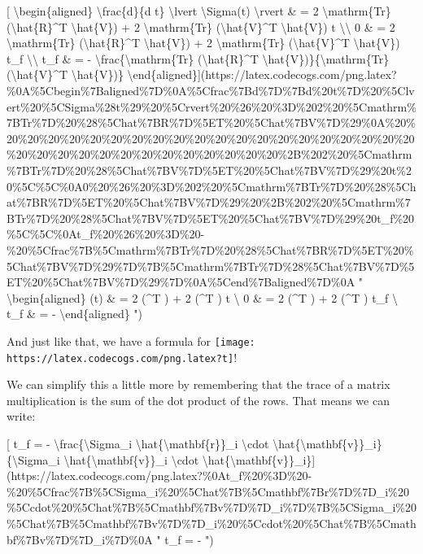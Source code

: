 \documentclass[]{article}
\begin{document}
{[} \textbackslash{}begin\{aligned\} \textbackslash{}frac\{d\}\{d t\}
\textbackslash{}lvert \textbackslash{}Sigma(t) \textbackslash{}rvert \& = 2
\textbackslash{}mathrm\{Tr\} (\textbackslash{}hat\{R\}\^{}T
\textbackslash{}hat\{V\}) + 2 \textbackslash{}mathrm\{Tr\}
(\textbackslash{}hat\{V\}\^{}T \textbackslash{}hat\{V\}) t
\textbackslash{}\textbackslash{} 0 \& = 2 \textbackslash{}mathrm\{Tr\}
(\textbackslash{}hat\{R\}\^{}T \textbackslash{}hat\{V\}) + 2
\textbackslash{}mathrm\{Tr\} (\textbackslash{}hat\{V\}\^{}T
\textbackslash{}hat\{V\}) t\_f \textbackslash{}\textbackslash{} t\_f \& = -
\textbackslash{}frac\{\textbackslash{}mathrm\{Tr\}
(\textbackslash{}hat\{R\}\^{}T
\textbackslash{}hat\{V\})\}\{\textbackslash{}mathrm\{Tr\}(\textbackslash{}hat\{V\}\^{}T
\textbackslash{}hat\{V\})\}
\textbackslash{}end\{aligned\}{]}(https://latex.codecogs.com/png.latex?\%0A\%5Cbegin\%7Baligned\%7D\%0A\%5Cfrac\%7Bd\%7D\%7Bd\%20t\%7D\%20\%5Clvert\%20\%5CSigma\%28t\%29\%20\%5Crvert\%20\%26\%20\%3D\%202\%20\%5Cmathrm\%7BTr\%7D\%20\%28\%5Chat\%7BR\%7D\%5ET\%20\%5Chat\%7BV\%7D\%29\%0A\%20\%20\%20\%20\%20\%20\%20\%20\%20\%20\%20\%20\%20\%20\%20\%20\%20\%20\%20\%20\%20\%20\%20\%20\%20\%20\%20\%20\%20\%20\%20\%20\%20\%20\%2B\%202\%20\%5Cmathrm\%7BTr\%7D\%20\%28\%5Chat\%7BV\%7D\%5ET\%20\%5Chat\%7BV\%7D\%29\%20t\%20\%5C\%5C\%0A0\%20\%26\%20\%3D\%202\%20\%5Cmathrm\%7BTr\%7D\%20\%28\%5Chat\%7BR\%7D\%5ET\%20\%5Chat\%7BV\%7D\%29\%20\%2B\%202\%20\%5Cmathrm\%7BTr\%7D\%20\%28\%5Chat\%7BV\%7D\%5ET\%20\%5Chat\%7BV\%7D\%29\%20t\_f\%20\%5C\%5C\%0At\_f\%20\%26\%20\%3D\%20-\%20\%5Cfrac\%7B\%5Cmathrm\%7BTr\%7D\%20\%28\%5Chat\%7BR\%7D\%5ET\%20\%5Chat\%7BV\%7D\%29\%7D\%7B\%5Cmathrm\%7BTr\%7D\%28\%5Chat\%7BV\%7D\%5ET\%20\%5Chat\%7BV\%7D\%29\%7D\%0A\%5Cend\%7Baligned\%7D\%0A
" \textbackslash{}begin\{aligned\}  \lvert \Sigma(t) \rvert \& = 2
 (\^{}T ) + 2  (\^{}T ) t
\textbackslash{} 0 \& = 2  (\^{}T ) + 2 
(\^{}T ) t\_f \textbackslash{} t\_f \& = -
\textbackslash{}end\{aligned\} ")

And just like that, we have a formula for
\texttt{[image: https://latex.codecogs.com/png.latex?t]}!

We can simplify this a little more by remembering that the trace of a matrix
multiplication is the sum of the dot product of the rows. That means we can
write:

{[} t\_f = - \textbackslash{}frac\{\textbackslash{}Sigma\_i
\textbackslash{}hat\{\textbackslash{}mathbf\{r\}\}\_i \textbackslash{}cdot
\textbackslash{}hat\{\textbackslash{}mathbf\{v\}\}\_i\}\{\textbackslash{}Sigma\_i
\textbackslash{}hat\{\textbackslash{}mathbf\{v\}\}\_i \textbackslash{}cdot
\textbackslash{}hat\{\textbackslash{}mathbf\{v\}\}\_i\}{]}(https://latex.codecogs.com/png.latex?\%0At\_f\%20\%3D\%20-\%20\%5Cfrac\%7B\%5CSigma\_i\%20\%5Chat\%7B\%5Cmathbf\%7Br\%7D\%7D\_i\%20\%5Ccdot\%20\%5Chat\%7B\%5Cmathbf\%7Bv\%7D\%7D\_i\%7D\%7B\%5CSigma\_i\%20\%5Chat\%7B\%5Cmathbf\%7Bv\%7D\%7D\_i\%20\%5Ccdot\%20\%5Chat\%7B\%5Cmathbf\%7Bv\%7D\%7D\_i\%7D\%0A
" t\_f = -
")
\end{document}
